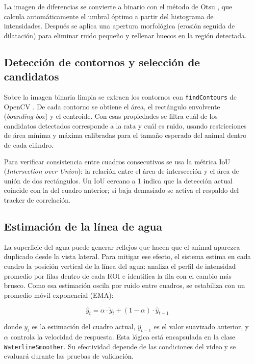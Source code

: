 La imagen de diferencias se convierte a binario con el método de Otsu \cite{otsu1979},
que calcula automáticamente el umbral óptimo a partir del histograma de intensidades.
Después se aplica una apertura morfológica (erosión seguida de dilatación) para
eliminar ruido pequeño y rellenar huecos en la región detectada.

\subsection{Detección de contornos y selección de candidatos}

Sobre la imagen binaria limpia se extraen los contornos con \texttt{findContours} de
OpenCV \cite{suzuki1985}. De cada contorno se obtiene el área, el rectángulo envolvente
(\textit{bounding box}) y el centroide. Con esas propiedades se filtra cuál de los
candidatos detectados corresponde a la rata y cuál es ruido, usando restricciones de
área mínima y máxima calibradas para el tamaño esperado del animal dentro de cada
cilindro.

Para verificar consistencia entre cuadros consecutivos se usa la métrica IoU
(\textit{Intersection over Union}): la relación entre el área de intersección y el
área de unión de dos rectángulos. Un IoU cercano a 1 indica que la detección actual
coincide con la del cuadro anterior; si baja demasiado se activa el respaldo del
tracker de correlación.

\subsection{Estimación de la línea de agua}

La superficie del agua puede generar reflejos que hacen que el animal aparezca
duplicado desde la vista lateral. Para mitigar ese efecto, el sistema estima en cada
cuadro la posición vertical de la línea del agua: analiza el perfil de intensidad
promedio por filas dentro de cada ROI e identifica la fila con el cambio más brusco.
Como esa estimación oscila por ruido entre cuadros, se estabiliza con un promedio
móvil exponencial (EMA):

\begin{equation}
    \hat{y}_t = \alpha \cdot \tilde{y}_t + (1 - \alpha) \cdot \hat{y}_{t-1}
    \label{eq:ema}
\end{equation}

donde $\tilde{y}_t$ es la estimación del cuadro actual, $\hat{y}_{t-1}$ es el valor
suavizado anterior, y $\alpha$ controla la velocidad de respuesta. Esta lógica está
encapsulada en la clase \texttt{WaterlineSmoother}. Su efectividad depende de las
condiciones del video y se evaluará durante las pruebas de validación.

